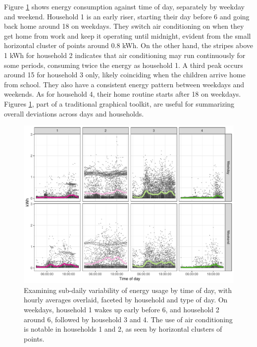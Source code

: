 \documentclass[12pt]{article}
\begin{document}
Figure \ref{fig:hod} shows energy consumption against time of day, separately by weekday and weekend. Household 1 is an early riser, starting their day before 6 and going back home around 18 on weekdays. They switch air conditioning on when they get home from work and keep it operating until midnight, evident from the small horizontal cluster of points around 0.8 kWh. On the other hand, the stripes above 1 kWh for household 2 indicates that air conditioning may run continuously for some periods, consuming twice the energy as household 1. A third peak occurs around 15 for household 3 only, likely coinciding when the children arrive home from school. They also have a consistent energy pattern between weekdays and weekends. As for household 4, their home routine starts after 18 on weekdays. Figures \ref{fig:hod}, part of a traditional graphical toolkit, are useful for summarizing overall deviations across days and households.

\begin{figure}

{\centering \includegraphics[width=\textwidth]{figure/hod-1} 

}

\caption{Examining sub-daily variability of energy usage by time of day, with hourly averages overlaid, faceted by household and type of day. On weekdays, household 1 wakes up early before 6, and household 2 around 6, followed by household 3 and 4. The use of air conditioning is notable in households 1 and 2, as seen by horizontal clusters of points.}\label{fig:hod}
\end{figure}
\end{document}
